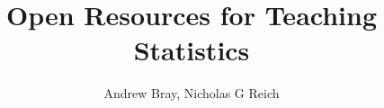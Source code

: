 
\usepackage{multicol}

\title{Open Resources for Teaching Statistics }
\newcommand{\ModuleShortname}{}
\author{Andrew Bray, Nicholas G Reich}
\newcommand{\LicenseText}{Made available under the Creative Commons Attribution-ShareAlike 3.0 Unported License: http://creativecommons.org/licenses/by-sa/3.0/deed.en\textunderscore US }
\newcommand{\Instructor}{UMass-Amherst Probability and Statistics Seminar Series}
\newcommand{\Course}{7 April 2014}

\hypersetup{colorlinks=true, urlcolor=blue, linkcolor=black}






\begin{frame}[plain]
	\titlepage
\end{frame}



